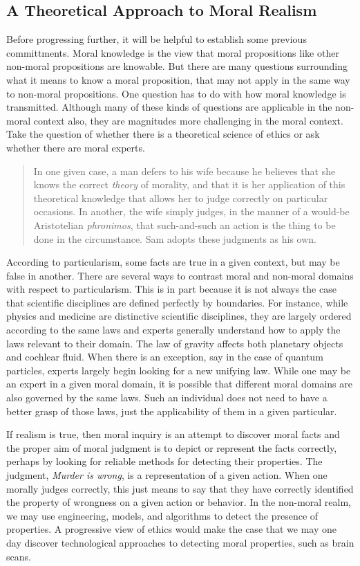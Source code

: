 \documentclass[
  12pt,
]{book}
\theoremstyle{definition}
\theoremstyle{definition}
\theoremstyle{definition}
\theoremstyle{definition}
\theoremstyle{remark}
\begin{document}
\subsection{A Theoretical Approach to Moral Realism}\label{a-theoretical-approach-to-moral-realism}

Before progressing further, it will be helpful to establish some previous committments. Moral knowledge is the view that moral propositions like other non-moral propositions are knowable. But there are many questions surrounding what it means to know a moral proposition, that may not apply in the same way to non-moral propositions. One question has to do with how moral knowledge is transmitted. Although many of these kinds of questions are applicable in the non-moral context also, they are magnitudes more challenging in the moral context. Take the question of whether there is a theoretical science of ethics or ask whether there are moral experts.

\begin{quote}
In one given case, a man defers to his wife because he believes that she knows the correct \emph{theory} of morality, and that it is her application of this theoretical knowledge that allows her to judge correctly on particular occasions. In another, the wife simply judges, in the manner of a would-be Aristotelian \emph{phronimos}, that such-and-such an action is the thing to be done in the circumstance. Sam adopts these judgments as his own.
\end{quote}

According to particularism, some facts are true in a given context, but may be false in another. There are several ways to contrast moral and non-moral domains with respect to particularism. This is in part because it is not always the case that scientific disciplines are defined perfectly by boundaries. For instance, while physics and medicine are distinctive scientific disciplines, they are largely ordered according to the same laws and experts generally understand how to apply the laws relevant to their domain. The law of gravity affects both planetary objects and cochlear fluid. When there is an exception, say in the case of quantum particles, experts largely begin looking for a new unifying law. While one may be an expert in a given moral domain, it is possible that different moral domains are also governed by the same laws. Such an individual does not need to have a better grasp of those laws, just the applicability of them in a given particular.

If realism is true, then moral inquiry is an attempt to discover moral facts and the proper aim of moral judgment is to depict or represent the facts correctly, perhaps by looking for reliable methods for detecting their properties. The judgment, \emph{Murder is wrong}, is a representation of a given action. When one morally judges correctly, this just means to say that they have correctly identified the property of wrongness on a given action or behavior. In the non-moral realm, we may use engineering, models, and algorithms to detect the presence of properties. A progressive view of ethics would make the case that we may one day discover technological approaches to detecting moral properties, such as brain scans.
\end{document}
